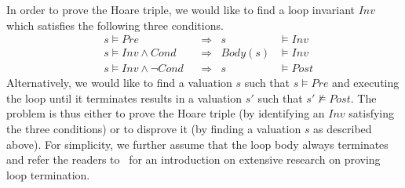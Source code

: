 In order to prove the Hoare triple, we would like to find a loop invariant $\mathit{Inv}$ which satisfies the following three conditions.
\begin{align}
    &s \models \mathit{Pre}
        &&\Longrightarrow & s &\models \mathit{Inv} \label{inv:pre} \\
    &s \models \mathit{Inv} \wedge \mathit{Cond}
        &&\Longrightarrow & \mathit{Body}(s) &\models \mathit{Inv} \label{inv:loop} \\
    &s \models \mathit{Inv} \wedge \neg \mathit{Cond}
        &&\Longrightarrow & s &\models \mathit{Post} \label{inv:post}
\end{align}
Alternatively, we would like to find a valuation $s$ such that $s \models \mathit{Pre}$ and executing the loop until it terminates results in a valuation $s'$ such that $s' \not \models Post$.
The problem is thus either to prove the Hoare triple (by identifying an $\mathit{Inv}$ satisfying the three conditions) or to disprove it (by finding a valuation $s$ as described above). For simplicity, we further assume that the loop body always terminates and refer the readers to~\cite{acmcomm} for an introduction on extensive research on proving loop termination.

